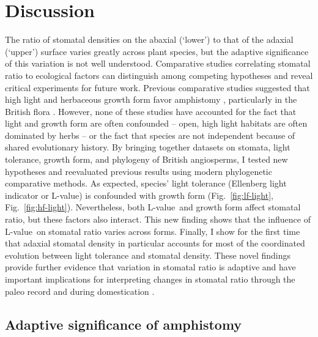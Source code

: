 \documentclass[12pt, oneside]{article}
\newcommand{\el}{L-value}
\begin{document}
\section*{Discussion}

The ratio of stomatal densities on the abaxial (`lower') to that of the adaxial (`upper') surface varies greatly across plant species, but the adaptive significance of this variation is not well understood. Comparative studies correlating stomatal ratio to ecological factors can distinguish among competing hypotheses and reveal critical experiments for future work. Previous comparative studies suggested that high light and herbaceous growth form favor amphistomy \citep{Mott_etal_1982, Jordan_etal_2014, Muir_2015, Bucher_etal_2017}, particularly in the British flora \citep{Salisbury_1927, Peat_Fitter_1994b}. However, none of these studies have accounted for the fact that light and growth form are often confounded -- open, high light habitats are often dominated by herbs -- or the fact that species are not independent because of shared evolutionary history. By bringing together datasets on stomata, light tolerance, growth form, and phylogeny of British angiosperms, I tested new hypotheses and reevaluated previous results using modern phylogenetic comparative methods. As expected, species' light tolerance (Ellenberg light indicator or \el) is confounded with growth form (Fig.~\ref{fig:lf-light}, Fig.~\ref{fig:hf-light}). Nevertheless, both \el~and growth form affect stomatal ratio, but these factors also interact. This new finding shows that the influence of \el~on stomatal ratio varies across forms. Finally, I show for the first time that adaxial stomatal density in particular accounts for most of the coordinated evolution between light tolerance and stomatal density. These novel findings provide further evidence that variation in stomatal ratio is adaptive and have important implications for interpreting changes in stomatal ratio through the paleo record \citep{Jordan_etal_2014} and during domestication \citep{Milla_etal_2013}.

\subsection*{Adaptive significance of amphistomy}
\end{document}
